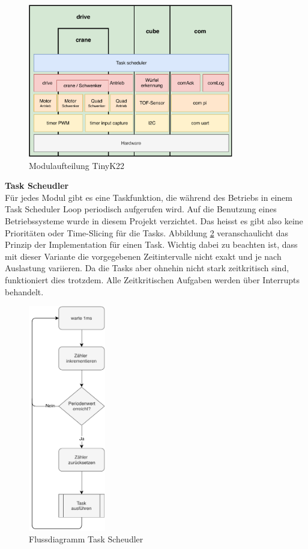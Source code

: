 \documentclass[../../main.tex]{subfiles}
\begin{document}
    \begin{figure}[H]
        \centering
        \includegraphics[width=0.8\textwidth]{../../images/et/et_mc_softwarekonzept.pdf}
        \caption {Modulaufteilung TinyK22}
        \label{fig:et_mc_softwarekonzept}
    \end{figure}

    \textbf{Task Scheudler}\\
    Für jedes Modul gibt es eine Taskfunktion, die während des Betriebs in einem Task Scheduler Loop periodisch aufgerufen wird. Auf die Benutzung eines Betriebssysteme wurde in diesem Projekt verzichtet. Das heisst es gibt also keine Prioritäten oder Time-Slicing für die Tasks. Abbildung \ref{fig:et_task_scheudler} veranschaulicht das Prinzip der Implementation für einen Task. Wichtig dabei zu beachten ist, dass mit dieser Variante die vorgegebenen Zeitintervalle nicht exakt und je nach Auslastung variieren. Da die Tasks aber ohnehin nicht stark zeitkritisch sind, funktioniert dies trotzdem. Alle Zeitkritischen Aufgaben werden über Interrupts behandelt.

    \begin{figure}[H]
        \centering
        \includegraphics[width=0.3\textwidth]{../../images/et/et_task_scheudler.pdf}
        \caption {Flussdiagramm Task Scheudler}
        \label{fig:et_task_scheudler}
    \end{figure}
\end{document}
